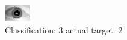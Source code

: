 \begin{figure}[h!]
\begin{center}
\includegraphics[width=0.60\columnwidth]{figures/ID1679_class_3_target_2.png}
\end{center}
\caption{ Classification: 3 actual target: 2}
\label{fig:ID1679_class_3_target_2}
\end{figure}
